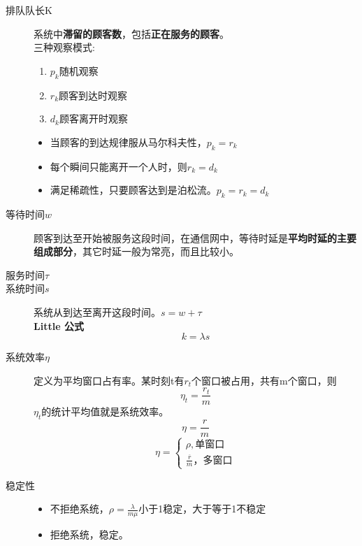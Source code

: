 \begin{description}
	\item[排队队长K] 系统中\textbf{滞留的顾客数}，包括\textbf{正在服务的顾客}。\\
	三种观察模式:
	\begin{enumerate}
		\item $ p_k $随机观察
		\item $ r_k $顾客到达时观察
		\item $ d_k $顾客离开时观察
	\end{enumerate}
	\begin{itemize}
		\item 当顾客的到达规律服从马尔科夫性，$ p_k = r_k $
		\item 每个瞬间只能离开一个人时，则$ r_k = d_k $
		\item 满足稀疏性，只要顾客达到是泊松流。$ p_k = r_k = d_k $
	\end{itemize}
	\item[等待时间$ w $] 顾客到达至开始被服务这段时间，在通信网中，等待时延是\textbf{平均时延的主要组成部分}，其它时延一般为常亮，而且比较小。
	\item[服务时间$ \tau $] 
	\item[系统时间$ s $] 系统从到达至离开这段时间。$ s = w+\tau$\\
	\textbf{Little 公式}
	\begin{equation}\label{key}
	k = \lambda s
	\end{equation}
	\item[系统效率$ \eta $] 定义为平均窗口占有率。某时刻t有$ r_t $个窗口被占用，共有m个窗口，则\begin{equation}\label{key}
	\eta_t = \frac{r_t}{m}
	\end{equation}
	$ \eta_t $的统计平均值就是系统效率。
	\begin{equation}\label{key}
	\eta = \frac{r}{m}
	\end{equation}
	\begin{equation}\label{key}
	\eta = \begin{cases}
	\rho,\text{单窗口}\\
	\frac{\overline{r}}{m}，\text{多窗口}
	\end{cases}
	\end{equation}
	\item[稳定性] 	\hspace{1pt}
	\begin{itemize}
		\item 不拒绝系统，$ \rho = \frac{\lambda}{m\mu} $小于1稳定，大于等于1不稳定
		\item 拒绝系统，稳定。
	\end{itemize}
\end{description}
